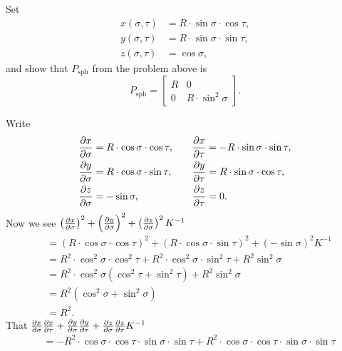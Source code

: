 \documentclass{ximera}
\begin{document}
\begin{problem}
  Set
  \begin{align*}
    x(\sigma,\tau) &=R\cdot \sin\sigma\cdot \cos \tau,\\
    y(\sigma,\tau) &=R\cdot \sin\sigma\cdot \sin\tau,\\
    z(\sigma,\tau) &=\cos \sigma,
  \end{align*}
  and show that $P_\mathrm{sph}$ from the problem above is
  \[
  P_\mathrm{sph} =
  \begin{bmatrix}
    R & 0 \\
    0 & R\cdot\sin^2 \sigma
  \end{bmatrix}.
  \]
  \begin{freeResponse}
    Write
    \[
    \begin{split}
      \pp[x]{\sigma} &= R\cdot \cos\sigma\cdot \cos \tau, \\
      \pp[y]{\sigma} &= R\cdot \cos\sigma\cdot \sin\tau,\\
      \pp[z]{\sigma} &= -\sin\sigma,
    \end{split}
    \qquad
    \begin{split}
      \pp[x]{\tau} &= -R\cdot \sin\sigma\cdot \sin \tau,\\
      \pp[y]{\tau} &= R\cdot \sin\sigma\cdot \cos\tau,\\
      \pp[z]{\tau} &= 0. 
    \end{split}
    \]
    Now we see $\left(\pp[x]{\sigma}\right)^2 + \left(\pp[y]{\sigma}\right)^2 + \left(\pp[z]{\sigma}\right)^2K^{-1}$
    \begin{align*}
      &= \left(R\cdot \cos\sigma\cdot \cos \tau \right)^2 + \left(R\cdot \cos\sigma\cdot \sin\tau\right)^2 + \left(-\sin\sigma\right)^2K^{-1}\\
      &= R^2\cdot \cos^2\sigma\cdot \cos^2 \tau + R^2\cdot \cos^2\sigma\cdot \sin^2\tau + R^2 \sin^2\sigma \\
      &= R^2\cdot \cos^2\sigma\left(\cos^2 \tau + \sin^2\tau\right) + R^2 \sin^2\sigma \\
      &= R^2\left(\cos^2\sigma + \sin^2\sigma\right) \\
      &= R^2.
    \end{align*}
    That $\pp[x]{\sigma}\pp[x]{\tau} + \pp[y]{\sigma}\pp[y]{\tau} + \pp[z]{\sigma}\pp[z]{\tau} K^{-1}$
    \begin{align*}
      &= -R^2\cdot \cos\sigma\cdot \cos \tau \cdot \sin\sigma\cdot \sin \tau + R^2\cdot \cos\sigma\cdot \cos \tau \cdot \sin\sigma\cdot \sin \tau\\

\end{align*}
\end{freeResponse}
\end{problem}
\end{document}

